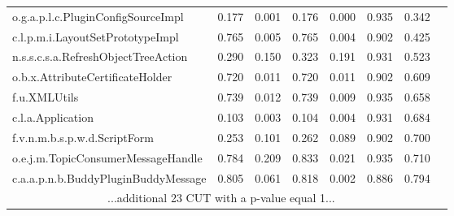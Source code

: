 \begin{tabular}{llllllll}
\multicolumn{1}{l|}{o.g.a.p.l.c.PluginConfigSourceImpl}                     & 0.177          & \multicolumn{1}{l|}{0.001}          & 0.176          & \multicolumn{1}{l|}{0.000}          & 0.935          & 0.342          & \\
\multicolumn{1}{l|}{c.l.p.m.i.LayoutSetPrototypeImpl}                       & 0.765          & \multicolumn{1}{l|}{0.005}          & 0.765          & \multicolumn{1}{l|}{0.004}          & 0.902          & 0.425          & \\
\multicolumn{1}{l|}{n.s.s.c.s.a.RefreshObjectTreeAction}                    & 0.290          & \multicolumn{1}{l|}{0.150}          & 0.323          & \multicolumn{1}{l|}{0.191}          & 0.931          & 0.523          & \\
\multicolumn{1}{l|}{o.b.x.AttributeCertificateHolder}                       & 0.720          & \multicolumn{1}{l|}{0.011}          & 0.720          & \multicolumn{1}{l|}{0.011}          & 0.902          & 0.609         &  \\
\multicolumn{1}{l|}{f.u.XMLUtils}                                           & 0.739          & \multicolumn{1}{l|}{0.012}          & 0.739          & \multicolumn{1}{l|}{0.009}          & 0.935          & 0.658         &  \\
\multicolumn{1}{l|}{c.l.a.Application}                                      & 0.103          & \multicolumn{1}{l|}{0.003}          & 0.104          & \multicolumn{1}{l|}{0.004}          & 0.931          & 0.684         &  \\
\multicolumn{1}{l|}{f.v.n.m.b.s.p.w.d.ScriptForm}                           & 0.253          & \multicolumn{1}{l|}{0.101}          & 0.262          & \multicolumn{1}{l|}{0.089}          & 0.902          & 0.700         &  \\
\multicolumn{1}{l|}{o.e.j.m.TopicConsumerMessageHandle}                     & 0.784          & \multicolumn{1}{l|}{0.209}          & 0.833          & \multicolumn{1}{l|}{0.021}          & 0.935          & 0.710        &   \\
\multicolumn{1}{l|}{c.a.a.p.n.b.BuddyPluginBuddyMessage}                    & 0.805          & \multicolumn{1}{l|}{0.061}          & 0.818          & \multicolumn{1}{l|}{0.002}          & 0.886          & 0.794         &  \\
\multicolumn{7}{c}{...additional 23 CUT with a p-value equal 1...}                                                                                                                                                            \\ \hline
\end{tabular}